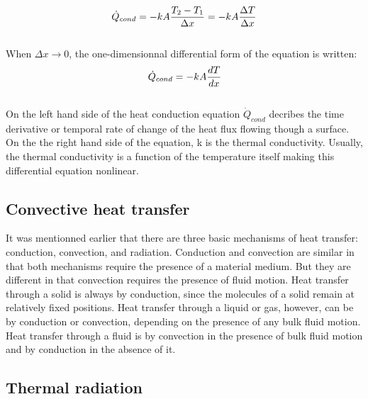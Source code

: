 \\
\begin{equation}
    \dot{Q}_{cond} = -kA\frac{T_2 - T_1}{\Delta x} = -kA\frac{\Delta T}{\Delta x}
    \tagaddtext{[\si{\watt}]}
    \label{eqn:CondEqInt}
\end{equation}
\\
\normalsize{When $\Delta x \rightarrow 0$,  the one-dimensionnal differential form of the equation is written:}
\\
\begin{equation}
    \dot{Q}_{cond} = -kA\frac{dT}{dx}
    \tagaddtext{[\si{\watt}]}
    \label{eqn:CondEq}
\end{equation}
\\
\normalsize{\indent On the left hand side of the heat conduction equation  $\dot{Q}_{cond}$ decribes the time derivative or temporal rate of change of the heat flux flowing though a surface. On the the right hand side of the equation, k is the thermal conductivity. Usually, the thermal conductivity is a function of the temperature itself making this differential equation nonlinear. }
\\
\subsection{Convective heat transfer}
\normalsize{It was mentionned earlier that there are three basic mechanisms of heat transfer: conduction, convection, and radiation. Conduction and convection are similar in that both mechanisms require the presence of a material medium. But they are different in that convection requires the presence of fluid motion. Heat transfer through a solid is always by conduction, since the molecules of a solid remain at relatively fixed positions. Heat transfer through a liquid or
gas, however, can be by conduction or convection, depending on the presence of any bulk fluid motion. Heat transfer through a fluid is by convection in the presence of bulk fluid motion and by conduction in the absence of it.}
\subsection{Thermal radiation}